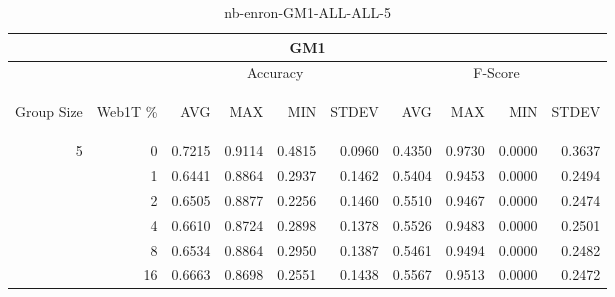 \begin{center}
\begin{table}[htbp] 
 \begin{center}
\begin{tabular}{ | r | r | r | r | r | r | r | r | r | r |}
\hline
\multicolumn{10}{|c|}{GM1}\\
\hline
 & & \multicolumn{4}{|c|}{Accuracy} & \multicolumn{4}{|c|}{F-Score}\\ \cline{3-10}
\begin{sideways}Group Size\end{sideways} & \begin{sideways}Web1T \%\end{sideways} & \begin{sideways}AVG\end{sideways} & \begin{sideways}MAX\end{sideways} & \begin{sideways}MIN\end{sideways} & \begin{sideways}STDEV\end{sideways} & \begin{sideways}AVG\end{sideways} & \begin{sideways}MAX\end{sideways} & \begin{sideways}MIN\end{sideways} & \begin{sideways}STDEV\end{sideways}\\
\hline
\multirow{5}{*}{5}
 & 0 & 0.7215 & 0.9114 & 0.4815 & 0.0960 & 0.4350 & 0.9730 & 0.0000 & 0.3637\\ \cline{2-10}
 & 1 & 0.6441 & 0.8864 & 0.2937 & 0.1462 & 0.5404 & 0.9453 & 0.0000 & 0.2494\\ \cline{2-10}
 & 2 & 0.6505 & 0.8877 & 0.2256 & 0.1460 & 0.5510 & 0.9467 & 0.0000 & 0.2474\\ \cline{2-10}
 & 4 & 0.6610 & 0.8724 & 0.2898 & 0.1378 & 0.5526 & 0.9483 & 0.0000 & 0.2501\\ \cline{2-10}
 & 8 & 0.6534 & 0.8864 & 0.2950 & 0.1387 & 0.5461 & 0.9494 & 0.0000 & 0.2482\\ \cline{2-10}
 & 16 & 0.6663 & 0.8698 & 0.2551 & 0.1438 & 0.5567 & 0.9513 & 0.0000 & 0.2472\\ \cline{2-10}
\hline
\end{tabular}
\caption{nb-enron-GM1-ALL-ALL-5}
\label{table:nb-enron-GM1-ALL-ALL-5}
\end{center}
 \end{table}
\end{center}

